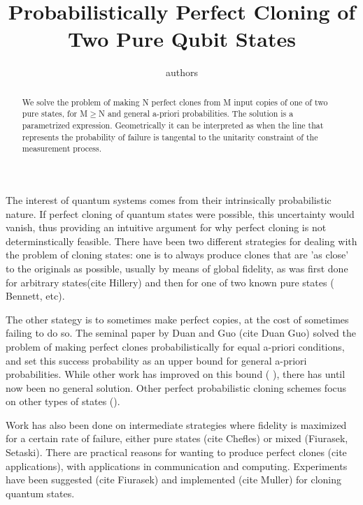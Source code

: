 \documentclass[aps,prl,twocolumn,eqsecnum,showpacs]{revtex4}
\begin{document}
  \title{Probabilistically Perfect Cloning of Two Pure Qubit States}
  \author{authors}


  \begin{abstract}We solve the problem of making N perfect clones from M input copies of one of two pure states, for M$\geq$N and general a-priori probabilities.  The solution is a parametrized expression.  Geometrically it can be interpreted as when the line that represents the probability of failure is tangental to the unitarity constraint of the measurement process.
\end{abstract}
\maketitle 

 The interest of quantum systems comes from their intrinsically probabilistic nature. If perfect cloning of quantum states were possible, this uncertainty would vanish, thus providing an intuitive argument for why perfect cloning is not determinstically feasible.  There have been two different strategies for dealing with the problem of cloning states:  one is to always produce clones that are 'as close' to the originals as possible, usually by means of global fidelity, as was first done for arbitrary states(cite Hillery) and then for one of two known pure states ( Bennett, etc).  

The other stategy is to sometimes make perfect copies, at the cost of sometimes failing to do so.  The seminal paper by Duan and Guo (cite Duan Guo) solved the problem of making perfect clones probabilistically for equal a-priori conditions, and set this success probability as an upper bound for general a-priori probabilities. While other work has improved on this bound ( ), there has until now been no general solution.  Other perfect probabilistic cloning schemes focus on other types of states ().

 Work has also been done on intermediate strategies where fidelity is maximized for a certain rate of failure, either pure states (cite Chefles) or mixed (Fiurasek, Setaski). There are practical reasons for wanting to produce perfect clones (cite applications), with applications in communication and computing. Experiments have been suggested (cite Fiurasek) and implemented (cite Muller) for cloning quantum states.
\end{document}
